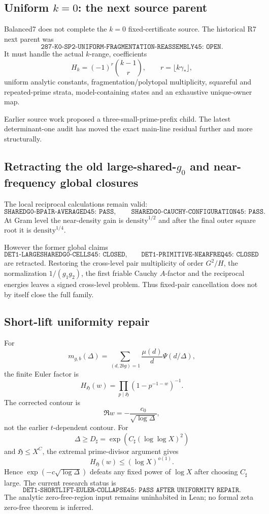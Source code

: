 \documentclass[11pt]{article}
\theoremstyle{definition}
\newcommand{\1}{\mathbf 1}
\begin{document}
\subsection{Uniform $k=0$: the next source parent}

Balanced7 does not complete the $k=0$ fixed-certificate source.  The historical R7 next parent was
\[
\boxed{\texttt{287-K0-SP2-UNIFORM-FRAGMENTATION-REASSEMBLY45: OPEN}}.
\]
It must handle the actual $k$-range, coefficients
\[
H_k=(-1)^r\binom{k-1}{r},
\qquad r=\lfloor k\gamma_*\rfloor,
\]
uniform analytic constants, fragmentation/polytopal multiplicity, squareful and
repeated-prime strata, model-containing states and an exhaustive unique-owner map.

Earlier source work proposed a three-small-prime-prefix child.  The latest determinant-one
audit has moved the exact main-line residual further and more structurally.

\subsection{Retracting the old large-shared-$g_0$ and near-frequency global closures}

The local reciprocal calculations remain valid:
\[
\texttt{SHAREDG0-BPAIR-AVERAGED45: PASS},
\qquad
\texttt{SHAREDG0-CAUCHY-CONFIGURATION45: PASS}.
\]
At Gram level the near-density gain is $\mathrm{density}^{1/2}$ and after the final outer
square root it is $\mathrm{density}^{1/4}$.

However the former global claims
\[
\texttt{DET1-LARGESHAREDG0-CELLS45: CLOSED},
\qquad
\texttt{DET1-PRIMITIVE-NEARFREQ45: CLOSED}
\]
are retracted.  Restoring the cross-level pair multiplicity of order $G^2/H$, the
normalization $1/(g_1g_2)$, the first friable Cauchy $A$-factor and the reciprocal energies
leaves a signed cross-level problem.  Thus fixed-pair cancellation does not by itself
close the full family.

\subsection{Short-lift uniformity repair}

For
\[
m_{g,b}(\Delta)
=
\sum_{(d,2bg)=1}\frac{\mu(d)}d\Psi(d/\Delta),
\]
the finite Euler factor is
\[
H_{\mathfrak H}(w)
=
\prod_{p\mid\mathfrak H}(1-p^{-1-w})^{-1}.
\]
The corrected contour is
\[
\Re w=-\frac{c_0}{\sqrt{\log\Delta}},
\]
not the earlier $t$-dependent contour.  For
\[
\Delta\ge D_\sharp
=
\exp(C_\sharp(\log\log X)^2)
\]
and $\mathfrak H\le X^C$, the extremal prime-divisor argument gives
\[
H_{\mathfrak H}(w)\le(\log X)^{o(1)}.
\]
Hence $\exp(-c\sqrt{\log\Delta})$ defeats any fixed power of $\log X$ after choosing
$C_\sharp$ large.  The current research status is
\[
\boxed{\texttt{DET1-SHORTLIFT-EULER-COLLAPSE45:
PASS AFTER UNIFORMITY REPAIR}}.
\]
The analytic zero-free-region input remains uninhabited in Lean; no formal zeta
zero-free theorem is inferred.
\end{document}
